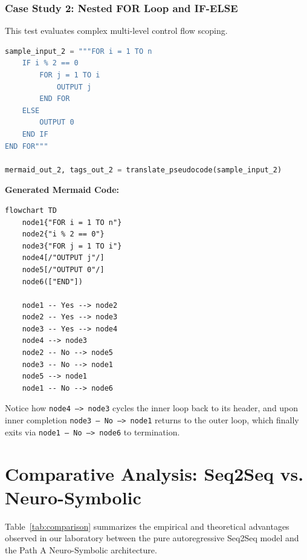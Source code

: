 \documentclass[11pt,a4paper]{article}
\begin{document}
\subsubsection{Case Study 2: Nested FOR Loop and IF-ELSE}
This test evaluates complex multi-level control flow scoping.
\begin{lstlisting}[language=Python]
sample_input_2 = """FOR i = 1 TO n
    IF i % 2 == 0
        FOR j = 1 TO i
            OUTPUT j
        END FOR
    ELSE
        OUTPUT 0
    END IF
END FOR"""

mermaid_out_2, tags_out_2 = translate_pseudocode(sample_input_2)
\end{lstlisting}

\textbf{Generated Mermaid Code:}
\begin{lstlisting}
flowchart TD
    node1{"FOR i = 1 TO n"}
    node2{"i % 2 == 0"}
    node3{"FOR j = 1 TO i"}
    node4[/"OUTPUT j"/]
    node5[/"OUTPUT 0"/]
    node6(["END"])

    node1 -- Yes --> node2
    node2 -- Yes --> node3
    node3 -- Yes --> node4
    node4 --> node3
    node2 -- No --> node5
    node3 -- No --> node1
    node5 --> node1
    node1 -- No --> node6
\end{lstlisting}
Notice how \texttt{node4 --> node3} cycles the inner loop back to its header, and upon inner completion \texttt{node3 -- No --> node1} returns to the outer loop, which finally exits via \texttt{node1 -- No --> node6} to termination.

\section{Comparative Analysis: Seq2Seq vs. Neuro-Symbolic}

Table~\ref{tab:comparison} summarizes the empirical and theoretical advantages observed in our laboratory between the pure autoregressive Seq2Seq model and the Path A Neuro-Symbolic architecture.
\end{document}
